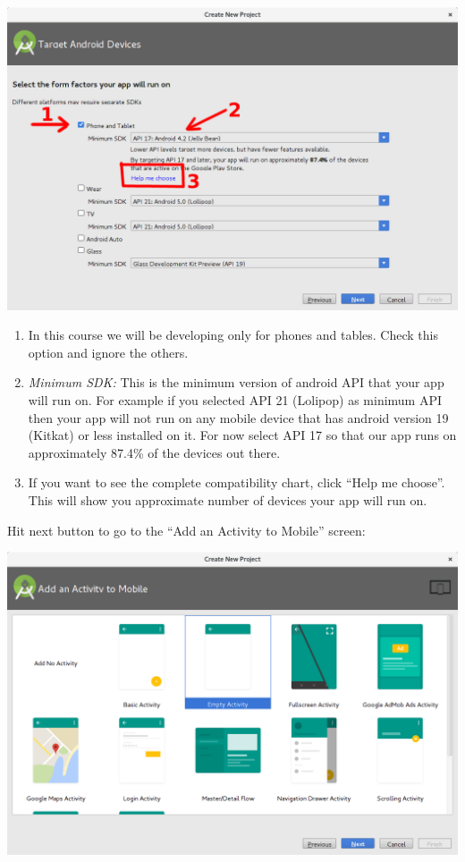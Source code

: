 \begin{center}
	\includegraphics[scale=0.2]{chapters/ch02/images/3_os_select}
\end{center}

\begin{enumerate}
	\item In this course we will be developing only for phones and tables. Check this option and ignore the others.
	\item \textit{Minimum SDK:} This is the minimum version of android API that your app will run on. For example if you selected API 21 (Lolipop) as minimum API then your app will not run on any mobile device that has android version 19 (Kitkat) or less installed on it. For now select API 17 so that our app runs on approximately 87.4\% of the devices out there. 
	\item If you want to see the complete compatibility chart, click ``Help me choose''. This will show you approximate number of devices your app will run on.
\end{enumerate}

Hit next button to go to the ``Add an Activity to Mobile'' screen:

\begin{center}
	\includegraphics[scale=0.2]{chapters/ch02/images/4_activity}
\end{center}

